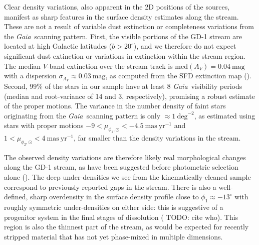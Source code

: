 \documentclass[modern]{aastex62}
\newcommand{\gaia}{\textsl{Gaia}}
\newcommand{\masyr}{\ensuremath{\textrm{mas}~\textrm{yr}^{-1}}}
\newcommand{\todo}[1]{{\color{red} TODO: #1}}
\begin{document}
Clear density variations, also apparent in the 2D positions of the sources,
manifest as sharp features in the surface density estimates along the stream.
These are not a result of variable dust extinction or completeness variations
from the \gaia\ scanning pattern.
First, the visible portions of the GD-1 stream are located at high Galactic
latitudes ($b > 20^\circ$), and we therefore do not expect significant dust
extinction or variations in extinction within the stream region.
The median $V$-band extinction over the stream track is
$\textrm{med}\left(A_V\right) = 0.04~\textrm{mag}$ with a dispersion
$\sigma_{A_V} \approx 0.03~\textrm{mag}$, as computed from the SFD extinction
map (\citealt{Schlegel:1998}).
Second, 99\% of the stars in our sample have at least 8 \gaia\ visibility
periods (median and root-variance of 14 and 3, respectively), promising a robust
estimate of the proper motions.
The variance in the number density of faint stars originating from the \gaia\
scanning pattern is only $\approx 1~\textrm{deg}^{-2}$, as estimated using stars
with proper motions $-9 < \mu_{\phi_1, \odot} < -4.5~\masyr$ and $1 <
\mu_{\phi_2, \odot} < 4~\masyr$, far smaller than the density variations in the
stream.

The observed density variations are therefore likely real morphological changes
along the GD-1 stream, as have been suggested before photometric selection alone
(\citealt{Carlberg:2013, DeBoer:2018}).
The deep under-densities we see from the kinematically-cleaned sample correspond
to previously reported gaps in the stream.
There is also a well-defined, sharp overdensity in the surface density profile
close to $\phi_1 \approx -13^\circ$ with roughly symmetric under-densities on
either side:
this is suggestive of a progenitor system in the final stages of dissolution
(\todo{cite who}).
This region is also the thinnest part of the stream, as would be expected for
recently stripped material that has not yet phase-mixed in multiple dimensions.
\end{document}
